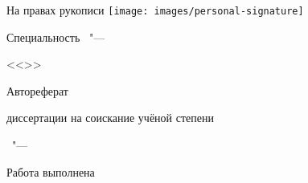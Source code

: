 \thispagestyle{empty}

\vspace{0pt plus1fill} %
\begin{flushright}
  \large{На правах рукописи}
  \texttt{[image: images/personal-signature]} 
\end{flushright}

\vspace{0pt plus3fill} %
\begin{center}
\textbf {\large \thesisAuthor}
\end{center}

\vspace{0pt plus3fill} %
\begin{center}
\textbf {\Large \thesisTitle}

\vspace{0pt plus3fill} %
{\large Специальность \thesisSpecialtyNumber\ "---\par <<\thesisSpecialtyTitle>>}

\vspace{0pt plus1.5fill} %
\Large{Автореферат}\par
\large{диссертации на соискание учёной степени\par \thesisDegree}
\end{center}

\vspace{0pt plus4fill} %
\begin{center}
{\large{\thesisCity\ "--- \thesisYear}}
\end{center}

\newpage
\thispagestyle{empty}
\begin{center}
\noindent Работа выполнена \thesisOrganization
\end{center}

